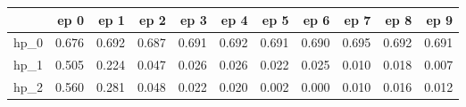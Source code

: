 \begin{tabular}{lrrrrrrrrrr}
\toprule
{} &   ep 0 &   ep 1 &   ep 2 &   ep 3 &   ep 4 &   ep 5 &   ep 6 &   ep 7 &   ep 8 &   ep 9 \\
\midrule
hp\_0 &  0.676 &  0.692 &  0.687 &  0.691 &  0.692 &  0.691 &  0.690 &  0.695 &  0.692 &  0.691 \\
hp\_1 &  0.505 &  0.224 &  0.047 &  0.026 &  0.026 &  0.022 &  0.025 &  0.010 &  0.018 &  0.007 \\
hp\_2 &  0.560 &  0.281 &  0.048 &  0.022 &  0.020 &  0.002 &  0.000 &  0.010 &  0.016 &  0.012 \\
\bottomrule
\end{tabular}
